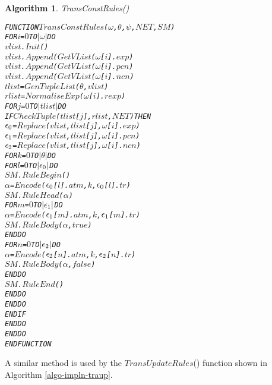 \documentclass[11pt]{report}
\newenvironment{vverbatim}
{
  \begin{alltt}
}
{
    \vspace{-\baselineskip}
  \end{alltt}
}
\newtheorem{vvalgorithm}{Algorithm}[chapter]
\newenvironment{valgorithm}[2]
{
  \begin{vvalgorithm}{#1}
    \label{#2}
    \small
    \begin{vverbatim}
}
{
    \end{vverbatim}
  \end{vvalgorithm}
}
\begin{document}
          \begin{valgorithm}{TransConstRules()}{algo-impln-traco}
FUNCTION \(TransConstRules\)(\(\omega\), \(\theta\), \(\psi\), \(NET\), \(SM\))
  FOR \(i\) = \(0\) TO \(|\omega|\) DO
    \(vlist\).\(Init\)()
    \(vlist\).\(Append\)(\(GetVList\)(\(\omega\)[\(i\)].\(exp\))
    \(vlist\).\(Append\)(\(GetVList\)(\(\omega\)[\(i\)].\(pcn\))
    \(vlist\).\(Append\)(\(GetVList\)(\(\omega\)[\(i\)].\(ncn\))
    \(tlist\) = \(GenTupleList\)(\(\theta\), \(vlist\))
    \(rlist\) = \(NormaliseExp\)(\(\omega\)[\(i\)].\(rexp\))
    FOR \(j\) = \(0\) TO \(|tlist|\) DO
      IF \(CheckTuple\)(\(tlist\)[\(j\)], \(rlist\), \(NET\)) THEN
        \(\epsilon\sb{0}\) = \(Replace\)(\(vlist\), \(tlist\)[\(j\)], \(\omega\)[\(i\)].\(exp\))
        \(\epsilon\sb{1}\) = \(Replace\)(\(vlist\), \(tlist\)[\(j\)], \(\omega\)[\(i\)].\(pcn\))
        \(\epsilon\sb{2}\) = \(Replace\)(\(vlist\), \(tlist\)[\(j\)], \(\omega\)[\(i\)].\(ncn\))
        FOR \(k\) = \(0\) TO \(|\theta|\) DO
          FOR \(l\) = \(0\) TO \(|\epsilon\sb{0}|\) DO
            \(SM\).\(RuleBegin\)()
            \(\alpha\) = \(Encode\)(\(\epsilon\sb{0}\)[\(l\)].\(atm\), \(k\), \(\epsilon\sb{0}\)[\(l\)].\(tr\))
            \(SM\).\(RuleHead\)(\(\alpha\))
            FOR \(m\) = \(0\) TO \(|\epsilon\sb{1}|\) DO
              \(\alpha\) = \(Encode\)(\(\epsilon\sb{1}\)[\(m\)].\(atm\), \(k\), \(\epsilon\sb{1}\)[\(m\)].\(tr\))
              \(SM\).\(RuleBody\)(\(\alpha\), \(true\))
            ENDDO
            FOR \(n\) = \(0\) TO \(|\epsilon\sb{2}|\) DO
              \(\alpha\) = \(Encode\)(\(\epsilon\sb{2}\)[\(n\)].\(atm\), \(k\), \(\epsilon\sb{2}\)[\(n\)].\(tr\))
              \(SM\).\(RuleBody\)(\(\alpha\), \(false\))
            ENDDO
            \(SM\).\(RuleEnd\)()
          ENDDO
        ENDDO
      ENDIF
    ENDDO
  ENDDO
ENDFUNCTION
          \end{valgorithm}

          A similar method is used by the $TransUpdateRules$() function
          shown in Algorithm \ref{algo-impln-traup}.
\end{document}
